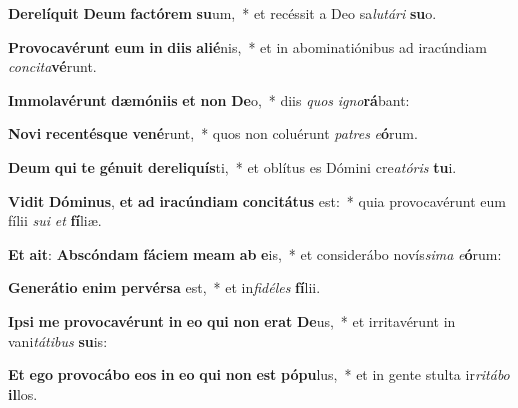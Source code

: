 \item \textbf{De}\textbf{re}\textbf{lí}\textbf{quit} \textbf{De}\textbf{um} \textbf{fac}\textbf{tó}\textbf{rem} \textbf{su}um,~* et recéssit a Deo sa\textit{lu}\textit{tá}\textit{ri} \textbf{su}o.
\item \textbf{Pro}\textbf{vo}\textbf{ca}\textbf{vé}\textbf{runt} \textbf{e}\textbf{um} \textbf{in} \textbf{di}\textbf{is} \textbf{a}\textbf{li}\textbf{é}nis,~* et in abominatiónibus ad iracúndiam \textit{con}\textit{ci}\textit{ta}\textbf{vé}runt.
\item \textbf{Im}\textbf{mo}\textbf{la}\textbf{vé}\textbf{runt} \textbf{dæ}\textbf{mó}\textbf{ni}\textbf{is} \textbf{et} \textbf{non} \textbf{De}o,~* diis \textit{quos} \textit{i}\textit{gno}\textbf{rá}bant:
\item \textbf{No}\textbf{vi} \textbf{re}\textbf{cen}\textbf{tés}\textbf{que} \textbf{ve}\textbf{né}runt,~* quos non coluérunt \textit{pa}\textit{tres} \textit{e}\textbf{ó}rum.
\item \textbf{De}\textbf{um} \textbf{qui} \textbf{te} \textbf{gé}\textbf{nu}\textbf{it} \textbf{de}\textbf{re}\textbf{li}\textbf{quís}ti,~* et oblítus es Dómini cre\textit{a}\textit{tó}\textit{ris} \textbf{tu}i.
\item \textbf{Vi}\textbf{dit} \textbf{Dó}\textbf{mi}\textbf{nus}, \textbf{et} \textbf{ad} \textbf{i}\textbf{ra}\textbf{cún}\textbf{di}\textbf{am} \textbf{con}\textbf{ci}\textbf{tá}\textbf{tus} est:~* quia provocavérunt eum fílii \textit{su}\textit{i} \textit{et} \textbf{fí}liæ.
\item \textbf{Et} \textbf{a}\textbf{it}: \textbf{Abs}\textbf{cón}\textbf{dam} \textbf{fá}\textbf{ci}\textbf{em} \textbf{me}\textbf{am} \textbf{ab} \textbf{e}is,~* et considerábo novís\textit{si}\textit{ma} \textit{e}\textbf{ó}rum:
\item \textbf{Ge}\textbf{ne}\textbf{rá}\textbf{ti}\textbf{o} \textbf{e}\textbf{nim} \textbf{per}\textbf{vér}\textbf{sa} est,~* et in\textit{fi}\textit{dé}\textit{les} \textbf{fí}lii.
\item \textbf{Ip}\textbf{si} \textbf{me} \textbf{pro}\textbf{vo}\textbf{ca}\textbf{vé}\textbf{runt} \textbf{in} \textbf{e}\textbf{o} \textbf{qui} \textbf{non} \textbf{e}\textbf{rat} \textbf{De}us,~* et irritavérunt in vani\textit{tá}\textit{ti}\textit{bus} \textbf{su}is:
\item \textbf{Et} \textbf{e}\textbf{go} \textbf{pro}\textbf{vo}\textbf{cá}\textbf{bo} \textbf{e}\textbf{os} \textbf{in} \textbf{e}\textbf{o} \textbf{qui} \textbf{non} \textbf{est} \textbf{pó}\textbf{pu}lus,~* et in gente stulta ir\textit{ri}\textit{tá}\textit{bo} \textbf{il}los.
